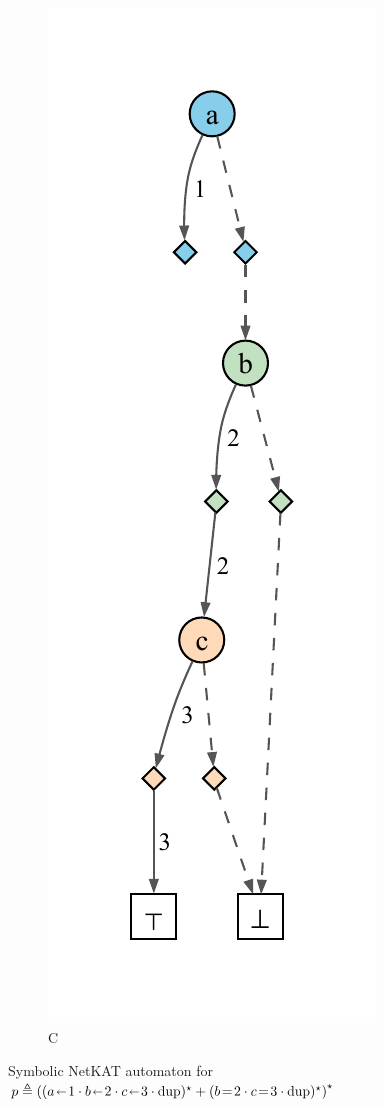 \documentclass[acmsmall,dvipsnames,nonacm]{acmart}
\begin{document}
\begin{figure}
\begin{subfigure}[b]{0.16\textwidth}
        \includegraphics[scale=0.45]{deriv/derivsppC.pdf}
        \caption*{C}
    \end{subfigure}
    \caption{Symbolic NetKAT automaton for $p \triangleq \left((a \mut 1 \cdot b \mut 2 \cdot c \mut 3 \cdot \text{dup})^\star + (b \test 2 \cdot c \test 3 \cdot \text{dup})^\star\right)^\star$}
    \label{fig:exaut}
\end{figure}
\end{document}
